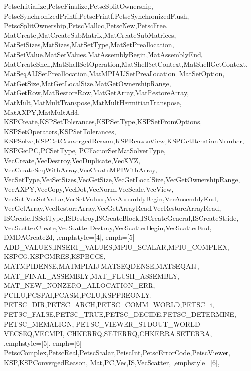 {{    PetscInitialize,PetscFinalize,PetscSplitOwnership,
    PetscSynchronizedPrintf,PetscPrintf,PetscSynchronizedFlush,
    PetscSplitOwnership,PetscMalloc,PetscNew,PetscFree,
    MatCreate,MatCreateSubMatrix,MatCreateSubMatrices,
    MatSetSizes,MatSizes,MatSetType,MatSetPreallocation,
    MatSetValue,MatSetValues,MatAssemblyBegin,MatAssemblyEnd,
    MatCreateShell,MatShellSetOperation,MatShellSetContext,MatShellGetContext,
    MatSeqAIJSetPreallocation,MatMPIAIJSetPreallocation,    
    MatSetOption,
    MatGetSize,MatGetLocalSize,MatGetOwnershipRange,
    MatGetRow,MatRestoreRow,MatGetArray,MatRestoreArray,
    MatMult,MatMultTranspose,MatMultHermitianTranspose,
    MatAXPY,MatMultAdd,
    KSPCreate,KSPSetTolerances,KSPSetType,KSPSetFromOptions,
    KSPSetOperators,KSPSetTolerances,
    KSPSolve,KSPGetConvergedReason,KSPReasonView,KSPGetIterationNumber,
    KSPGetPC,PCSetType,
    PCFactorSetMatSolverType,
    VecCreate,VecDestroy,VecDuplicate,VecXYZ,
    VecCreateSeqWithArray,VecCreateMPIWithArray,
    VecSetType,VecSetSizes,VecGetSize,VecGetLocalSize,VecGetOwnershipRange,
    VecAXPY,VecCopy,VecDot,VecNorm,VecScale,VecView,
    VecSet,VecSetValue,VecSetValues,VecAssemblyBegin,VecAssemblyEnd,
    VecGetArray,VecRestoreArray,VecGetArrayRead,VecRestoreArrayRead,
    ISCreate,ISSetType,ISDestroy,ISCreateBlock,ISCreateGeneral,ISCreateStride,
    VecScatterCreate,VecScatterDestroy,VecScatterBegin,VecScatterEnd,
    DMDACreate2d,
  },emphstyle={[4]\color{red!40!black}\bfseries},
  emph={[5] %
    ADD_VALUES,INSERT_VALUES,MPIU_SCALAR,MPIU_COMPLEX,
    KSPCG,KSPGMRES,KSPBCGS,
    MATMPIDENSE,MATMPIAIJ,MATSEQDENSE,MATSEQAIJ,
    MAT_FINAL_ASSEMBLY,MAT_FLUSH_ASSEMBLY,
    MAT_NEW_NONZERO_ALLOCATION_ERR,
    PCILU,PCSPAI,PCASM,PCLU,KSPPREONLY,
    PETSC_DIR,PETSC_ARCH,PETSC_COMM_WORLD,PETSC_i,
    PETSC_FALSE,PETSC_TRUE,PETSC_DECIDE,PETSC_DETERMINE,
    PETSC_MEMALIGN,
    PETSC_VIEWER_STDOUT_WORLD,
    VECSEQ,VECMPI,
    CHKERRQ,SETERRQ,CHKERRA,SETERRA,
  },emphstyle={[5]\color{green!60!black}},
  emph={[6] %
    PetscComplex,PetscReal,PetscScalar,PetscInt,PetscErrorCode,PetscViewer,
    KSP,KSPConvergedReason,
    Mat,PC,Vec,IS,VecScatter,
  },emphstyle={[6]\bfseries\color{blue}},
}
